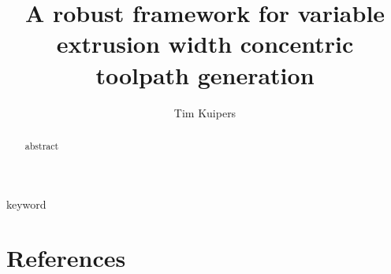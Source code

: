 \documentclass[5p,twocolumn,10pt,times]{elsarticle}
\newcommand{\temp}[1]{\textcolor[rgb]{0, 0, 0.2}{#1}}
\begin{document}
\baselineskip11pt %

\begin{frontmatter} %

\title{A robust framework for variable extrusion width concentric toolpath generation}


\author[um,tud]{Tim Kuipers}
\address[um]{Ultimaker, Utrecht, The Netherlands}
\address[tud]{Department of Design Engineering, Delft University of Technology, The Netherlands}


\begin{abstract}
abstract
\end{abstract}

%
%


\begin{keyword} %
keyword
\end{keyword}

\end{frontmatter}




 \temp{%
 \tableofcontents
 }















\section*{References}

\end{document}
